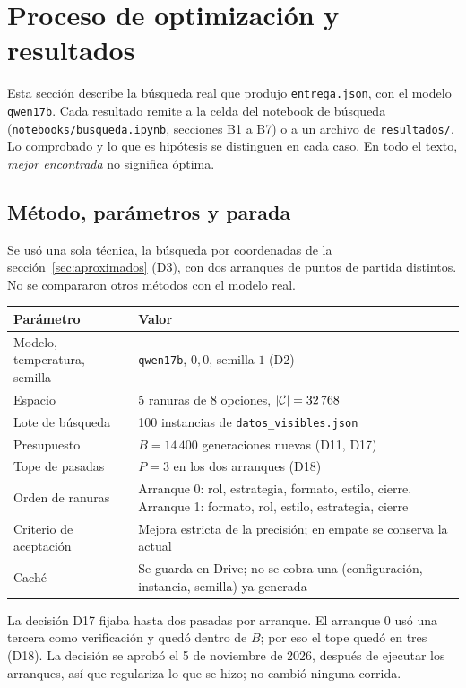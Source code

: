 \section{Proceso de optimización y resultados}
\label{sec:experimentos}

Esta sección describe la búsqueda real que produjo \texttt{entrega.json}, con el modelo
\texttt{qwen17b}. Cada resultado remite a la celda del notebook de búsqueda
(\texttt{notebooks/busqueda.ipynb}, secciones B1 a B7) o a un archivo de
\texttt{resultados/}. Lo comprobado y lo que es hipótesis se distinguen en cada caso. En
todo el texto, \emph{mejor encontrada} no significa óptima.

\subsection{Método, parámetros y parada}

Se usó una sola técnica, la búsqueda por coordenadas de la sección~\ref{sec:aproximados}
(D3), con dos arranques de puntos de partida distintos. No se compararon otros métodos con
el modelo real.

\begin{center}
\begin{tabular}{p{}p{}}
\toprule
Parámetro & Valor \\
\midrule
Modelo, temperatura, semilla & \texttt{qwen17b}, $0{,}0$, semilla $1$ (D2) \\
Espacio & 5 ranuras de 8 opciones, $|\mathcal{C}|=32\,768$ \\
Lote de búsqueda & 100 instancias de \texttt{datos\_visibles.json} \\
Presupuesto & $B=14\,400$ generaciones nuevas (D11, D17) \\
Tope de pasadas & $P=3$ en los dos arranques (D18) \\
Orden de ranuras & Arranque 0: rol, estrategia, formato, estilo, cierre. Arranque 1: formato, rol, estilo, estrategia, cierre \\
Criterio de aceptación & Mejora estricta de la precisión; en empate se conserva la actual \\
Caché & Se guarda en Drive; no se cobra una (configuración, instancia, semilla) ya generada \\
\bottomrule
\end{tabular}
\end{center}

La decisión D17 fijaba hasta dos pasadas por arranque. El arranque 0 usó una tercera como
verificación y quedó dentro de $B$; por eso el tope quedó en tres (D18). La decisión se
aprobó el 5 de noviembre de 2026, después de ejecutar los arranques, así que regulariza lo
que se hizo; no cambió ninguna corrida.

